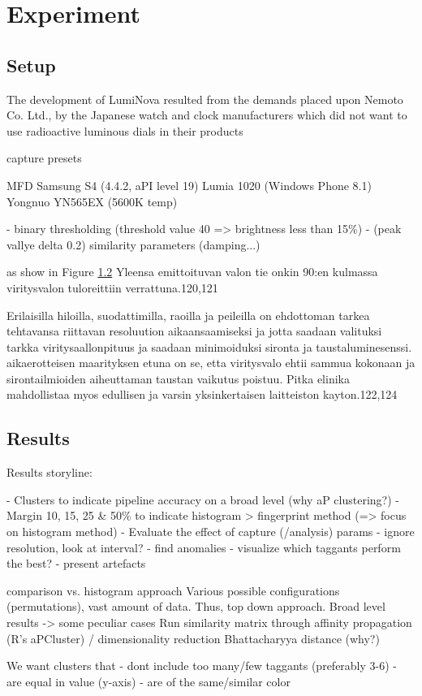 \documentclass[thesis.tex]{subfiles}
\begin{document}
\chapter{Experiment}
\label{chapter:experiment}

\section{Setup}

The development of LumiNova resulted from the demands placed upon Nemoto  Co. Ltd.,  by the Japanese watch and clock manufacturers which did not want to use radioactive luminous dials in their products

capture presets

MFD
Samsung S4 (4.4.2, aPI level 19)
Lumia 1020 (Windows Phone 8.1)
Yongnuo YN565EX (5600K temp)

- binary thresholding (threshold value 40 => brightness less than 15\%)
- (peak vallye delta 0.2)
similarity parameters (damping...)

as show in Figure \ref{} Yleensa emittoituvan valon tie onkin 90:en kulmassa viritysvalon tuloreittiin verrattuna.120,121

Erilaisilla hiloilla, suodattimilla, raoilla ja peileilla on ehdottoman tarkea tehtavansa riittavan resoluution aikaansaamiseksi ja jotta saadaan valituksi tarkka viritysaallonpituus ja saadaan minimoiduksi sironta ja taustaluminesenssi. aikaerotteisen maarityksen etuna on se, etta viritysvalo ehtii sammua kokonaan ja sirontailmioiden aiheuttaman taustan vaikutus poistuu. Pitka elinika mahdollistaa myos edullisen ja varsin yksinkertaisen laitteiston kayton.122,124

\section{Results}

Results storyline:

- Clusters to indicate pipeline accuracy on a broad level (why aP clustering?)
- Margin 10, 15, 25 \& 50\% to indicate histogram > fingerprint method (=> focus on histogram method)
- Evaluate the effect of capture (/analysis) params
  - ignore resolution, look at interval?
  - find anomalies
  - visualize which taggants perform the best?
- present artefacts

comparison vs. histogram approach
Various possible configurations (permutations), vast amount of data. Thus, top down approach. Broad level results -> some peculiar cases
Run similarity matrix through affinity propagation (R's aPCluster) / dimensionality reduction
Bhattacharyya distance (why?)

We want clusters that
- dont include too many/few taggants (preferably 3-6)
- are equal in value (y-axis)
- are of the same/similar color
\end{document}
